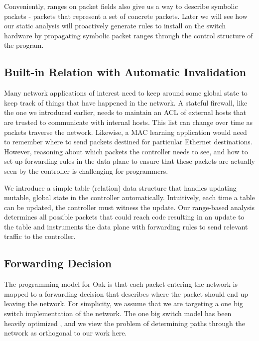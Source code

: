 \documentclass[preprint]{sigplanconf}
\begin{document}
Conveniently, ranges on packet fields also give us a way to describe symbolic packets - packets that represent a set of concrete packets. Later we will see how our static analysis will proactively generate rules to install on the switch hardware by propagating symbolic packet ranges through the control structure of the program.



     \subsection*{Built-in Relation with Automatic Invalidation}
	Many network applications of interest need to keep around some global state to keep track of things that have happened in the network. A stateful firewall, like the one we introduced earlier, needs to maintain an ACL of external hosts that are trusted to communicate with internal hosts. This list can change over time as packets traverse the network. Likewise, a MAC learning application would need to remember where to send packets destined for particular Ethernet destinations. However, reasoning about which packets the controller needs to see, and how to set up forwarding rules in the data plane to ensure that these packets are actually seen by the controller is challenging for programmers.
	
	We introduce a simple table (relation) data structure that handles updating mutable, global state in the controller automatically. Intuitively, each time a table can be updated, the controller must witness the update. Our range-based analysis determines all possible packets that could reach code resulting in an update to the table and instruments the data plane with forwarding rules to send relevant traffic to the controller.

   

     
  

   \subsection*{Forwarding Decision}
	The programming model for Oak is that each packet entering the network is mapped to a forwarding decision that describes where the packet should end up leaving the network. For simplicity, we assume that we are targeting a one big switch implementation of the network. The one big switch model has been heavily optimized \cite{Obs}, and we view the problem of determining paths through the network as orthogonal to our work here. 
  
\end{document}
